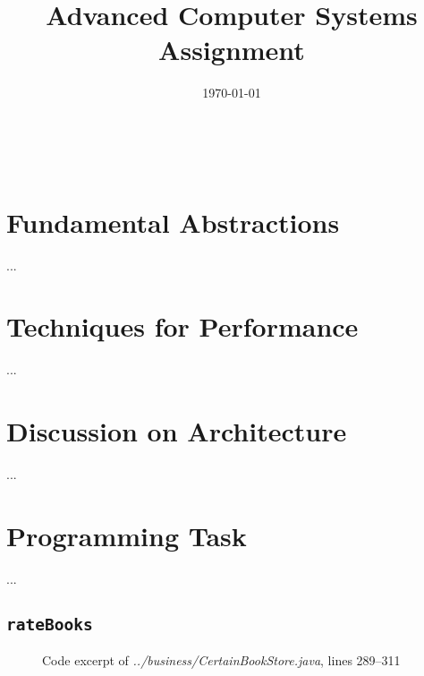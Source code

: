 \documentclass[10pt,a4paper]{article}
\title
{
    Advanced Computer Systems \\
    {\Large Assignment \assignmentnumber}
}
\author
{
    \authform{Hans J. T. Stephensen}{abc123}
    \and
    \authform{?}{abc123}
    \and
    \authform{Casper B. Hansen}{fvx507}
}
\date{\today}
\newcommand{\srcroot}{../src/com/acertainbookstore/}
\newcommand{\theabstract}
{
    \lipsum[1-1]
}
\newcommand{\colbreak}{{\ }\vfill\columnbreak}
\newcommand{\codeexcerpt}[3]
{
\begin{figure}[H]

\caption{Code excerpt of {\it ../#1}, lines #2--#3}
\end{figure}
}
\begin{document}
\clearpage
\maketitle
\thispagestyle{empty}

\setlength{\columnsep}{0pt}
\begin{multicols}{2}
    \abstract{\theabstract}
    \colbreak
    \tableofcontents
\end{multicols}
\setlength{\columnsep}{10pt}
\clearpage



\section{Fundamental Abstractions}
...



\section{Techniques for Performance}
...



\section{Discussion on Architecture}
...



\section{Programming Task}
...

\subsection{\tt rateBooks}
\codeexcerpt{business/CertainBookStore.java}{289}{311}
\end{document}
